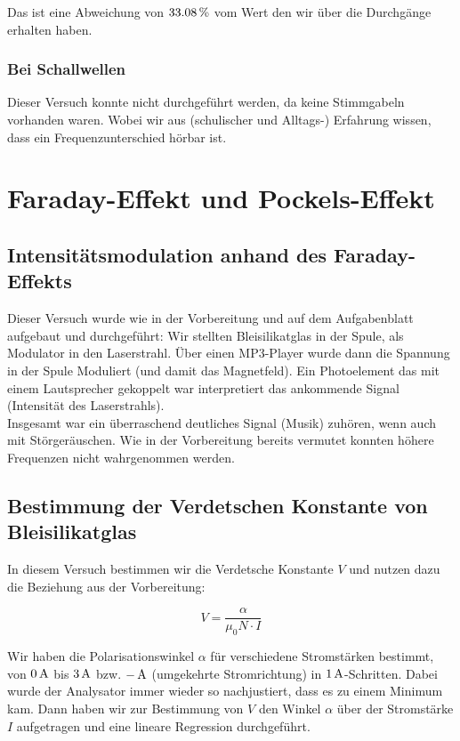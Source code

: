\documentclass[a4paper,titlepage]{scrartcl}
\numberwithin{equation}{section}
\begin{document}
Das ist eine Abweichung von $\unit[33.08]{\%}$ vom Wert den wir über die Durchgänge erhalten haben.
\subsubsection{Bei Schallwellen}
Dieser Versuch konnte nicht durchgeführt werden, da keine Stimmgabeln vorhanden waren. Wobei wir aus (schulischer und Alltags-) Erfahrung wissen, dass ein Frequenzunterschied hörbar ist.
\section{Faraday-Effekt und Pockels-Effekt}
\subsection{Intensitätsmodulation anhand des Faraday-Effekts}
Dieser Versuch wurde wie in der Vorbereitung und auf dem Aufgabenblatt aufgebaut und durchgeführt: Wir stellten Bleisilikatglas in der Spule, als Modulator in den Laserstrahl. Über einen MP3-Player wurde dann die Spannung in der Spule Moduliert (und damit das Magnetfeld). Ein Photoelement das mit einem Lautsprecher gekoppelt war interpretiert das ankommende Signal (Intensität des Laserstrahls).\\
Insgesamt war ein überraschend deutliches Signal (Musik) zuhören, wenn auch mit Störgeräuschen. Wie in der Vorbereitung bereits vermutet konnten höhere Frequenzen nicht wahrgenommen werden.
\subsection{Bestimmung der Verdetschen Konstante von Bleisilikatglas}
In diesem Versuch bestimmen wir die Verdetsche Konstante $V$ und nutzen dazu die Beziehung aus der Vorbereitung:

\begin{equation*}
V = \frac{\alpha}{\mu_0 N \cdot I}
\end{equation*}

Wir haben die Polarisationswinkel $\alpha$ für verschiedene Stromstärken bestimmt, von $\unit[0]{A}$ bis $\unit[3]{A}$ bzw. $\unit[-]{A}$ (umgekehrte Stromrichtung) in $\unit[1]{A}$-Schritten. Dabei wurde der Analysator immer wieder so nachjustiert, dass es zu einem Minimum kam. Dann haben wir zur Bestimmung von $V$ den Winkel $\alpha$ über der Stromstärke $I$ aufgetragen und eine lineare Regression durchgeführt.\\ \\
\end{document}
